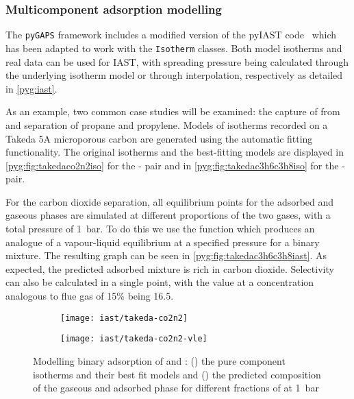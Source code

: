 \subsubsection{Multicomponent adsorption modelling}

The \texttt{pyGAPS} framework includes a modified version of 
the pyIAST code~\cite{simonPyIASTIdealAdsorbed2016} which has 
been adapted to work with the \texttt{Isotherm} 
classes. Both model isotherms and real data can be used for 
\gls{IAST}, with spreading pressure being calculated through the 
underlying isotherm model or through interpolation, respectively
as detailed in \autoref{pyg:iast}.

As an example, two common case studies will be examined: the capture of
 from  and separation of propane and propylene.
Models of isotherms recorded on a Takeda 5A microporous carbon are
generated using the automatic fitting functionality. 
The original isotherms and the best-fitting models are displayed in 
\autoref{pyg:fig:takedaco2n2iso} for the - pair and 
in \autoref{pyg:fig:takedac3h6c3h8iso} for the - pair.

For the carbon dioxide separation, all equilibrium
points for the adsorbed and gaseous phases are simulated 
at different proportions of the two gases, with a total pressure
of \SI{1}{\bar}. To do this we use the 
function which produces an analogue of a vapour-liquid equilibrium at 
a specified pressure for a binary mixture. The resulting graph can be seen
in \autoref{pyg:fig:takedac3h6c3h8iast}.
As expected, the predicted adsorbed mixture is rich in carbon dioxide.
Selectivity can also be calculated in a single point, with the value at
a concentration analogous to flue gas of 15\%  being 16.5. 

\begin{figure}[htb]

    \centering
    \begin{subfigure}[b]{.42\textwidth}
        \centering
        \texttt{[image: iast/takeda-co2n2]}
        \caption{}%
        \label{pyg:fig:takedaco2n2iso}
    \end{subfigure}%
    \begin{subfigure}[b]{.4\textwidth}
        \centering
        \texttt{[image: iast/takeda-co2n2-vle]}
        \caption{}%
        \label{pyg:fig:takedaco2n2iast}
    \end{subfigure}
    \caption{
    Modelling binary adsorption of  and : 
    (\protect{}) the pure component
    isotherms and their best fit models and 
    (\protect{}) 
    the predicted composition of the gaseous
    and adsorbed phase for different fractions of 
     at \SI{1}{\bar}
    }%
    \label{pyg:fig:takedaco2n2}

\end{figure}

